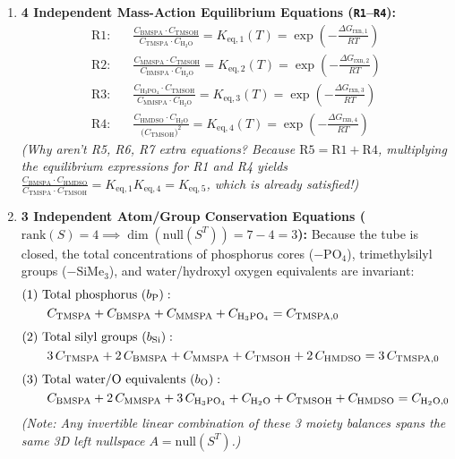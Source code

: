 \documentclass[11pt,a4paper]{article}
\begin{document}
\begin{enumerate}[leftmargin=1.8em]
    \item \textbf{4 Independent Mass-Action Equilibrium Equations (\texttt{R1}--\texttt{R4}):}
    \begin{align}
    \text{R1:} \quad & \frac{C_{\text{BMSPA}} \cdot C_{\text{TMSOH}}}{C_{\text{TMSPA}} \cdot C_{\text{H}_2\text{O}}} = K_{\text{eq}, 1}(T) = \exp\!\left(-\frac{\Delta G_{\text{rxn}, 1}}{RT}\right) \\[4pt]
    \text{R2:} \quad & \frac{C_{\text{MMSPA}} \cdot C_{\text{TMSOH}}}{C_{\text{BMSPA}} \cdot C_{\text{H}_2\text{O}}} = K_{\text{eq}, 2}(T) = \exp\!\left(-\frac{\Delta G_{\text{rxn}, 2}}{RT}\right) \\[4pt]
    \text{R3:} \quad & \frac{C_{\text{H}_3\text{PO}_4} \cdot C_{\text{TMSOH}}}{C_{\text{MMSPA}} \cdot C_{\text{H}_2\text{O}}} = K_{\text{eq}, 3}(T) = \exp\!\left(-\frac{\Delta G_{\text{rxn}, 3}}{RT}\right) \\[4pt]
    \text{R4:} \quad & \frac{C_{\text{HMDSO}} \cdot C_{\text{H}_2\text{O}}}{\big(C_{\text{TMSOH}}\big)^2} = K_{\text{eq}, 4}(T) = \exp\!\left(-\frac{\Delta G_{\text{rxn}, 4}}{RT}\right)
    \end{align}
    \emph{(Why aren't R5, R6, R7 extra equations? Because $\text{R5} = \text{R1} + \text{R4}$, multiplying the equilibrium expressions for R1 and R4 yields $\frac{C_{\text{BMSPA}} \cdot C_{\text{HMDSO}}}{C_{\text{TMSPA}} \cdot C_{\text{TMSOH}}} = K_{\text{eq}, 1} K_{\text{eq}, 4} = K_{\text{eq}, 5}$, which is already satisfied!)}

    \item \textbf{3 Independent Atom/Group Conservation Equations ($\text{rank}(S) = 4 \implies \dim(\text{null}(S^T)) = 7 - 4 = 3$):}
    Because the tube is closed, the total concentrations of phosphorus cores ($-\text{PO}_4$), trimethylsilyl groups ($-\text{SiMe}_3$), and water/hydroxyl oxygen equivalents are invariant:
    \begin{align}
    &\text{(1) Total phosphorus } (b_{\text{P}}): \notag\\
    &\qquad C_{\text{TMSPA}} + C_{\text{BMSPA}} + C_{\text{MMSPA}} + C_{\text{H}_3\text{PO}_4} = C_{\text{TMSPA}, 0} \\[4pt]
    &\text{(2) Total silyl groups } (b_{\text{Si}}): \notag\\
    &\qquad 3\,C_{\text{TMSPA}} + 2\,C_{\text{BMSPA}} + C_{\text{MMSPA}} + C_{\text{TMSOH}} + 2\,C_{\text{HMDSO}} = 3\,C_{\text{TMSPA}, 0} \\[4pt]
    &\text{(3) Total water/O equivalents } (b_{\text{O}}): \notag\\
    &\qquad C_{\text{BMSPA}} + 2\,C_{\text{MMSPA}} + 3\,C_{\text{H}_3\text{PO}_4} + C_{\text{H}_2\text{O}} + C_{\text{TMSOH}} + C_{\text{HMDSO}} = C_{\text{H}_2\text{O}, 0}
    \end{align}
    \emph{(Note: Any invertible linear combination of these 3 moiety balances spans the same 3D left nullspace $A = \text{null}(S^T)$.)}
\end{enumerate}
\end{document}
